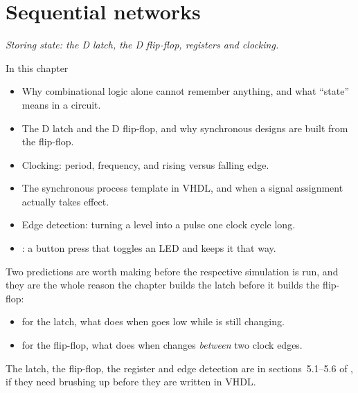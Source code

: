 
\chapter{Sequential networks}
\label{c3:ch}

{\large\itshape Storing state: the D latch, the D flip-flop, registers and clocking.\par}

\begin{chapterbox}{In this chapter}
\begin{itemize}
  \item Why combinational logic alone cannot remember anything, and what ``state'' means in a
    circuit.
  \item The D latch and the D flip-flop, and why synchronous designs are built from the flip-flop.
  \item Clocking: period, frequency, and rising versus falling edge.
  \item The synchronous process template in VHDL, and when a signal assignment actually takes
    effect.
  \item Edge detection: turning a level into a pulse one clock cycle long.
  \item {}: a button press that toggles an LED and keeps it that way.
\end{itemize}
\end{chapterbox}

Two predictions are worth making before the respective simulation is run, and they are the whole
reason the chapter builds the latch before it builds the flip-flop:
\begin{itemize}
  \item for the latch, what  does when  goes low while  is still
    changing.
  \item for the flip-flop, what  does when  changes \emph{between} two clock edges.
\end{itemize}

\note[Refresher] The latch, the flip-flop, the register and edge detection are in sections~5.1--5.6
of \debook{}, if they need brushing up before they are written in VHDL.




